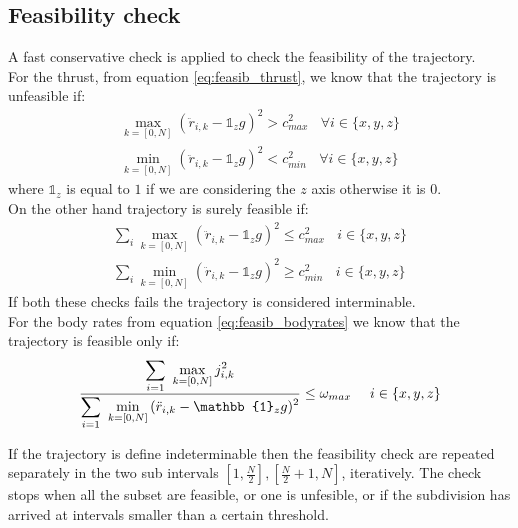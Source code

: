 \subsection{Feasibility check} \label{feasibility_check}
A fast conservative check is applied to check the feasibility of the trajectory.\\
For the thrust, from equation \ref{eq:feasib_thrust}, we know that the trajectory is unfeasible if:
\begin{align}
\max_{k=[0,N]} {(\ddot{r}_{i,k}- \mathbb{1}_zg)^2} > c_{max}^2 \ \ \ \ \forall i\in\{x,y,z\} \\
\min_{k=[0,N]} {(\ddot{r}_{i,k} - \mathbb{1}_zg)^2} < c_{min}^2 \ \ \ \ \forall i\in\{x,y,z\}
\end{align}
where $\mathbb{1}_z$ is equal to $1$ if we are considering the $z$ axis otherwise it is $0$.\\
On the other hand trajectory is surely feasible if:
\begin{align}
\sum_i{\max_{k=[0,N]} {(\ddot{r}_{i,k}- \mathbb{1}_zg)^2}} \leq c_{max}^2 \ \ \ \ i\in\{x,y,z\}\\
\sum_i{\min_{k=[0,N]} {(\ddot{r}_{i,k} - \mathbb{1}_zg)^2}} \geq c_{min}^2 \ \ \ \  i\in\{x,y,z\}
\label{eq:thrust_minmax}
\end{align}
If both these checks fails the trajectory is considered interminable.\\
For the body rates from equation \ref{eq:feasib_bodyrates} we know that the trajectory is feasible only if:
\begin{align}
\ddfrac{\sum\limits_{i=1} \  \max\limits_{k=[0,N]} j_{i,k}^2 }{\sum\limits_{i=1} \ {\min\limits_{k=[0,N]} {(\ddot{r}_{i,k} - \mathbb{1}_zg)^2}}} \leq \omega_{max} \ \ \ \ i\in\{x,y,z\}
\label{eq:body_rates_max}
\end{align}


If the trajectory is define indeterminable then the feasibility check are repeated separately in the two sub intervals $[1,\frac{N}{2}], [\frac{N}{2}+1,N]$, iteratively. The check stops when all the subset are feasible, or one is unfesible, or if the subdivision has arrived at intervals smaller than a certain threshold.


